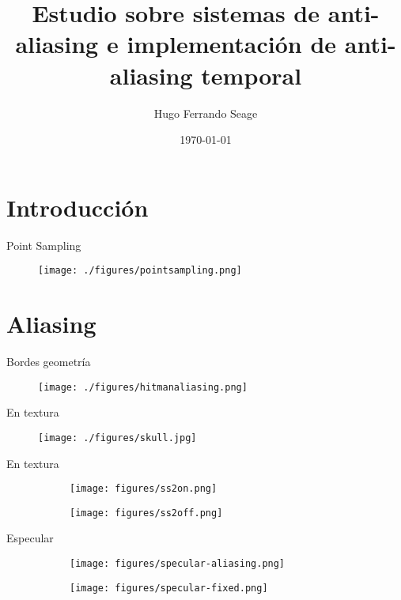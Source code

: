 \documentclass[table]{beamer}
\title{Estudio sobre sistemas de anti-aliasing e implementación de anti-aliasing temporal}
\date{\today}
\author{Hugo Ferrando Seage}
\institute{U-Tad - Máster Universitario en Computación Gráfica y Simulación}
\begin{document}
\begin{frame}
    \titlepage
\end{frame}

\section{Introducción}

\begin{frame}[fragile]{Point Sampling}
    \begin{figure}
        \texttt{[image: ./figures/pointsampling.png]}
    \end{figure}
\end{frame}

\section{Aliasing}

\begin{frame}[fragile]{Bordes geometría}
    \begin{figure}
        \texttt{[image: ./figures/hitmanaliasing.png]}
    \end{figure}
\end{frame}

\begin{frame}[fragile]{En textura}
    \begin{figure}
        \texttt{[image: ./figures/skull.jpg]}
    \end{figure}
\end{frame}

\begin{frame}[fragile]{En textura}
    \centering
    \begin{figure}[!htbp]
        \centering
        \begin{subfigure}[b]{0.45\textwidth}
            \texttt{[image: figures/ss2on.png]}
        \end{subfigure}
        \centering
        \begin{subfigure}[b]{0.45\textwidth}
            \texttt{[image: figures/ss2off.png]}
        \end{subfigure}
    \end{figure}
\end{frame}

\begin{frame}[fragile]{Especular}
    \begin{figure}[!htbp]
        \centering
        \begin{subfigure}[b]{0.45\textwidth}
            \texttt{[image: figures/specular-aliasing.png]}
        \end{subfigure}
        \centering
        \begin{subfigure}[b]{0.45\textwidth}
            \texttt{[image: figures/specular-fixed.png]}
        \end{subfigure}
    \end{figure}
\end{frame}
\end{document}
